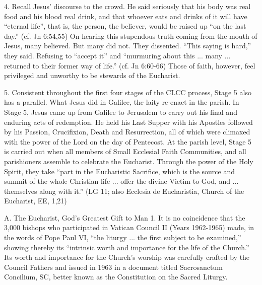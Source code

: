 \documentclass[oneside]{book}
\begin{document}
4. Recall Jesus' discourse to the crowd. He said seriously that his body was
real food and his blood real drink, and that whoever eats and drinks of it will
have ``eternal life'', that is, the person, the believer, would be raised up
``on the last day.'' (cf. Jn 6:54,55) On hearing this stupendous truth coming
from the mouth of Jesus, many believed. But many did not. They dissented. ``This
saying is hard,'' they said. Refusing to ``accept it'' and ``murmuring about
this ... many ... returned to their former way of life.'' (cf. Jn 6:60-66) Those
of faith, however, feel privileged and unworthy to be stewards of the Eucharist.

5. Consistent throughout the first four stages of the CLCC process, Stage 5 also
has a parallel. What Jesus did in Galilee, the laity re-enact in the parish. In
Stage 5, Jesus came up from Galilee to Jerusalem to carry out his final and
enduring acts of redemption. He held his Last Supper with his Apostles followed
by his Passion, Crucifixion, Death and Resurrection, all of which were climaxed
with the power of the Lord on the day of Pentecost. At the parish level, Stage 5
is carried out when all members of Small Ecclesial Faith Communities, and all
parishioners assemble to celebrate the Eucharist. Through the power of the Holy
Spirit, they take ``part in the Eucharistic Sacrifice, which is the source and
summit of the whole Christian life ... offer the divine Victim to God, and
... themselves along with it.'' (LG 11; also Ecclesia de Eucharistia, Church of
the Eucharist, EE, 1,21)

A. The Eucharist, God's Greatest Gift to Man
1. It is no coincidence that the 3,000 bishops who participated in Vatican
Council II (Years 1962-1965) made, in the words of Pope Paul VI, ``the liturgy
... the first subject to be examined,'' showing thereby its ``intrinsic worth
and importance for the life of the Church.'' Its worth and importance for the
Church's worship was carefully crafted by the Council Fathers and issued in 1963
in a document titled Sacrosanctum Concilium, SC, better known as the
Constitution on the Sacred Liturgy.
\end{document}
